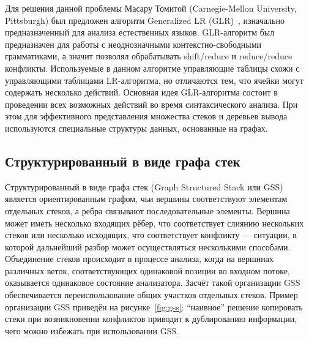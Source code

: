 Для решения данной проблемы Масару Томитой (Carnegie-Mellon University, Pittsburgh) был предложен алгоритм Generalized LR (GLR)~\cite{Tomita}, изначально предназначенный для анализа естественных языков. GLR-алгоритм был предназначен для работы с неоднозначными контекстно-свободными грамматиками, а значит позволял обрабатывать shift/reduce и reduce/reduce конфликты. Используемые в данном алгоритме управляющие таблицы схожи с управляющими таблицами LR-алгоритма, но отличаются тем, что ячейки могут содержать несколько действий. Основная идея GLR-алгоритма состоит в проведении всех возможных действий во время синтаксического анализа. При этом для эффективного представления множества стеков и деревьев вывода используются специальные структуры данных, основанные на графах.

\subsection{Структурированный в виде графа стек}

Структурированный в виде графа стек (Graph Structured Stack или GSS)~\cite{Tomita} является ориентированным графом, чьи вершины соответствуют  элементам отдельных стеков, а ребра связывают последовательные элементы. Вершина может иметь несколько входящих рёбер, что соответствует слиянию нескольких стеков или несколько исходящих, что соответствует конфликту --- ситуации, в которой дальнейший разбор может осуществляться несколькими способами. Объединение стеков происходит в процессе анализа, когда на вершинах различных веток, соответствующих одинаковой позиции во входном потоке, оказывается одинаковое состояние анализатора. Засчёт такой организации GSS обеспечивается переиспользование общих участков отдельных стеков. Пример организации GSS приведён на рисунке~\ref{fig:gss}: ``наивное'' решение копировать стеки при возникновении конфликтов приводит к дублированию информации, чего можно избежать при использовании GSS. 

